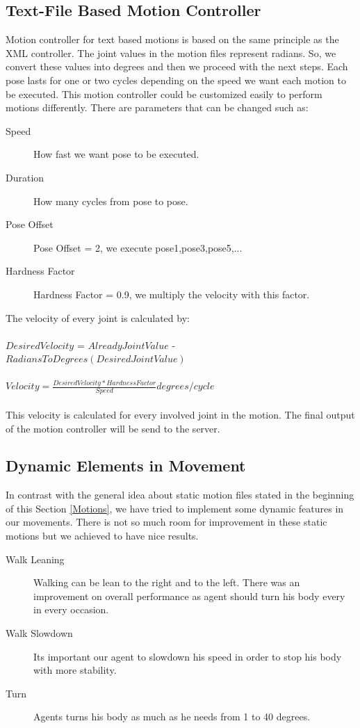 \subsection{Text-File Based Motion Controller}
Motion controller for text based motions is based on the same principle as the XML controller. The joint values in the motion files represent
radians. So, we convert these values into degrees and then we proceed with the next steps. Each pose lasts for one or two cycles depending on the speed we want each motion to be executed. This motion controller could be customized easily to perform motions differently. There are parameters that can be changed such as:
\begin{description}
	\item[Speed] How fast we want pose to be executed.
	\item[Duration]	How many cycles from pose to pose.
	\item[Pose Offset] Pose Offset = 2, we execute pose1,pose3,pose5,...
	\item[Hardness Factor]	Hardness Factor = 0.9, we multiply the velocity with this factor.
\end{description}
The velocity of every joint is calculated by:\\
\\
$Desired Velocity$ = $Already Joint Value$ - $RadiansToDegrees(Desired Joint Value)$
\\
\\
$Velocity = \frac {Desired Velocity \ast Hardness Factor} {Speed} degrees/cycle$\\
\\
This velocity is calculated for every involved joint in the motion. The final output of the motion controller will be send to the server.

\subsection{Dynamic Elements in Movement}
In contrast with the general idea about static motion files stated in the beginning of this Section \ref{Motions}, we have tried to implement some dynamic features in our movements. There is not so much room for improvement in these static motions but we achieved to have nice results.
\begin{description}
	\item[Walk Leaning] Walking can be lean to the right and to the left. There was an improvement on overall performance as agent should turn his body every in every occasion.
	\item[Walk Slowdown] Its important our agent to slowdown his speed in order to stop his body with more stability.
	\item[Turn]	Agents turns his body as much as he needs from 1 to 40 degrees.
\end{description} 


